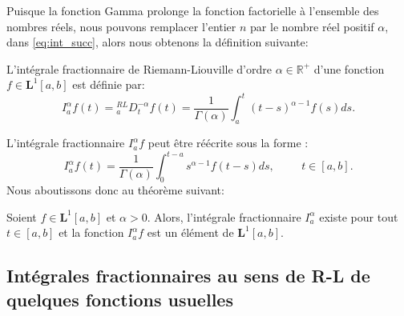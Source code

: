 Puisque la fonction Gamma prolonge la fonction factorielle à l'ensemble des nombres réels, nous pouvons remplacer l'entier $n$ par le nombre réel positif $\alpha$, dans \ref{eq:int_succ}, alors nous obtenons la définition suivante:
\begin{definition}
    L'intégrale fractionnaire de Riemann-Liouville d'ordre $\alpha \in \mathbb{R^+}$ d'une fonction $f\in \textbf{L}^1 [a,b]$ est définie par:
    \begin{equation}\label{eq:integraleR-L}
        I_{a}^{\alpha} f(t) = {}_a^{RL} D_t^{-\alpha} f(t) =\frac{1}{\Gamma(\alpha)} \int_{a}^{t} (t-s)^{\alpha-1} f(s) ds.
    \end{equation}
\end{definition}
L'intégrale fractionnaire $I_a^{\alpha} f$ peut être réécrite sous la forme :
\begin{equation}
    I_{a}^{\alpha} f(t) = \frac{1}{\Gamma(\alpha)} \int_{0}^{t-a} s^{\alpha -1}f(t-s)ds, \hspace{1cm} t\in[a,b].
\end{equation}
Nous aboutissons donc au théorème suivant:
\begin{theoreme}
    Soient $f\in \textbf{L}^1 [a,b]$ et $\alpha > 0$. Alors, l'intégrale fractionnaire $I_a^{\alpha}$ existe pour tout $t\in[a,b]$ et la fonction $I_a^{\alpha} f$ est un élément de $\textbf{L}^1 [a,b]$. 
\end{theoreme}
\subsection{Intégrales fractionnaires au sens de R-L de quelques fonctions usuelles}
